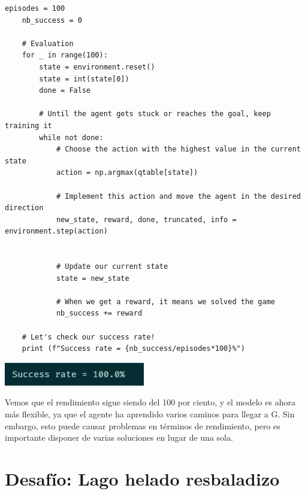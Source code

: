 \documentclass{article}
\begin{document}
\begin{lstlisting}[style=mystyle]
    episodes = 100
    nb_success = 0
    
    # Evaluation
    for _ in range(100):
        state = environment.reset()
        state = int(state[0])
        done = False
       
        # Until the agent gets stuck or reaches the goal, keep training it
        while not done:
            # Choose the action with the highest value in the current state
            action = np.argmax(qtable[state])
    
            # Implement this action and move the agent in the desired direction
            new_state, reward, done, truncated, info = environment.step(action)
        
    
            # Update our current state
            state = new_state
    
            # When we get a reward, it means we solved the game
            nb_success += reward
    
    # Let's check our success rate!
    print (f"Success rate = {nb_success/episodes*100}%")
\end{lstlisting}

\vspace{0.5cm}

\begin{center}
    \includegraphics[width=0.75\linewidth]{no_exploracion.png}
\end{center}

\vspace{0.5cm}

Vemos que el rendimiento sigue siendo del 100 por ciento, y el modelo es ahora más flexible, ya que el agente ha aprendido varios caminos para llegar a G. Sin embargo, esto puede causar problemas en términos de rendimiento, pero es importante disponer de varias soluciones en lugar de una sola.

\vspace{1cm}

\section{Desafío: Lago helado resbaladizo}

\vspace{1cm}
\end{document}
